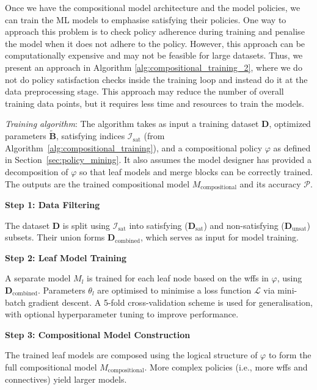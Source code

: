   

Once we have the compositional model architecture and the model policies, we can train the ML models to emphasise satisfying their policies. One way to approach this problem is to check policy adherence during training and penalise the model when it does not adhere to the policy. However, this approach can be computationally expensive and may not be feasible for large datasets. Thus, we present an approach in Algorithm \ref{alg:compositional_training_2}, where we do not do policy satisfaction checks inside the training loop and instead do it at the data preprocessing stage. This approach may reduce the number of overall training data points, but it requires less time and resources to train the models.



\noindent \textit{Training algorithm}: The algorithm takes as input a training dataset $\mathcal{\mathbf{D}}$, optimized parameters $\tilde{\mathbf{B}}$, satisfying indices $\mathcal{I}_{\text{sat}}$ (from Algorithm~\ref{alg:compositional_training}), and a compositional policy $\varphi$ as defined in Section~\ref{sec:policy_mining}. It also assumes the model designer has provided a decomposition of $\varphi$ so that leaf models and merge blocks can be correctly trained. The outputs are the trained compositional model $M_{\text{compositional}}$ and its accuracy $\mathcal{P}$.

\textbf{Step 1: Data Filtering}

The dataset $\mathcal{\mathbf{D}}$ is split using $\mathcal{I}_{\text{sat}}$ into satisfying ($\mathcal{\mathbf{D}}_{\text{sat}}$) and non-satisfying ($\mathcal{\mathbf{D}}_{\text{unsat}}$) subsets. Their union forms $\mathcal{\mathbf{D}}_{\text{combined}}$, which serves as input for model training.

\textbf{Step 2: Leaf Model Training}

A separate model $M_l$ is trained for each leaf node based on the wffs in $\varphi$, using $\mathcal{\mathbf{D}}_{\text{combined}}$. Parameters $\theta_l$ are optimised to minimise a loss function $\mathcal{L}$ via mini-batch gradient descent. A 5-fold cross-validation scheme is used for generalisation, with optional hyperparameter tuning to improve performance.

\textbf{Step 3: Compositional Model Construction}

The trained leaf models are composed using the logical structure of $\varphi$ to form the full compositional model $M_{\text{compositional}}$. More complex policies (i.e., more wffs and connectives) yield larger models.

